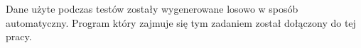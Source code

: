 \documentclass[12pt,a4paper,oneside]{report}
\begin{document}



Dane użyte podczas testów zostały wygenerowane losowo w sposób automatyczny. Program który zajmuje się tym zadaniem został dołączony do tej pracy.




\end{document}
